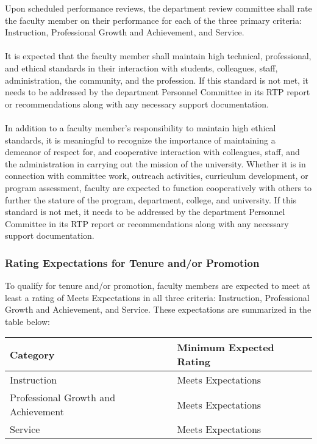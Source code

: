 \documentclass{article}
\begin{document}
Upon scheduled performance reviews, the department review committee shall rate the faculty member on their performance for each of the three primary criteria: Instruction, Professional Growth and Achievement, and Service.
\\\\
It is expected that the faculty member shall maintain high technical, professional, and ethical standards in their interaction with students, colleagues, staff, administration, the community, and the profession. If this standard is not met, it needs to be addressed by the department Personnel Committee in its RTP report or recommendations along with any necessary support documentation.
\\\\
In addition to a faculty member’s responsibility to maintain high ethical standards, it is meaningful to recognize the importance of maintaining a demeanor of respect for, and cooperative interaction with colleagues, staff, and the administration in carrying out the mission of the university. Whether it is in connection with committee work, outreach activities, curriculum development, or program assessment, faculty are expected to function cooperatively with others to further the stature of the program, department, college, and university. If this standard is not met, it needs to be addressed by the department Personnel Committee in its RTP report or recommendations along with any necessary support documentation.

\subsubsection{Rating Expectations for Tenure and/or Promotion}
To qualify for tenure and/or promotion, faculty members are expected to meet at least a rating of Meets Expectations in all three criteria: Instruction, Professional Growth and Achievement, and Service. These expectations are summarized in the table below:

\begin{longtable}{p{7cm}p{7cm}}

\hline
\textbf{Category} & \textbf{Minimum Expected Rating} \\
\hline
\endhead %
Instruction 	& Meets Expectations \\ \hline
Professional Growth and Achievement 	& Meets Expectations \\ \hline
Service 	& Meets Expectations \\ \hline
\end{longtable}
\end{document}
